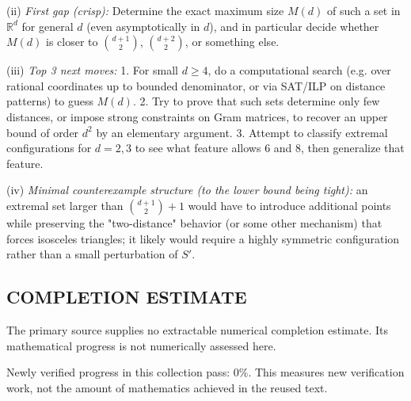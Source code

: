 (ii) \emph{First gap (crisp):} Determine the exact maximum size $M(d)$ of such a set in $\mathbb R^d$ for general $d$ (even asymptotically in $d$), and in particular decide whether $M(d)$ is closer to $\binom{d+1}{2}$, $\binom{d+2}{2}$, or something else.

(iii) \emph{Top 3 next moves:}
1. For small $d\ge 4$, do a computational search (e.g. over rational coordinates up to bounded denominator, or via SAT/ILP on distance patterns) to guess $M(d)$.
2. Try to prove that such sets determine only few distances, or impose strong constraints on Gram matrices, to recover an upper bound of order $d^2$ by an elementary argument.
3. Attempt to classify extremal configurations for $d=2,3$ to see what feature allows $6$ and $8$, then generalize that feature.

(iv) \emph{Minimal counterexample structure (to the lower bound being tight):} an extremal set larger than $\binom{d+1}{2}+1$ would have to introduce additional points while preserving the "two-distance" behavior (or some other mechanism) that forces isosceles triangles; it likely would require a highly symmetric configuration rather than a small perturbation of $S'$.




\subsection*{COMPLETION ESTIMATE}
The primary source supplies no extractable numerical completion estimate. Its mathematical progress is not numerically assessed here.

Newly verified progress in this collection pass: $0\%$. This measures new verification work, not the amount of mathematics achieved in the reused text.
